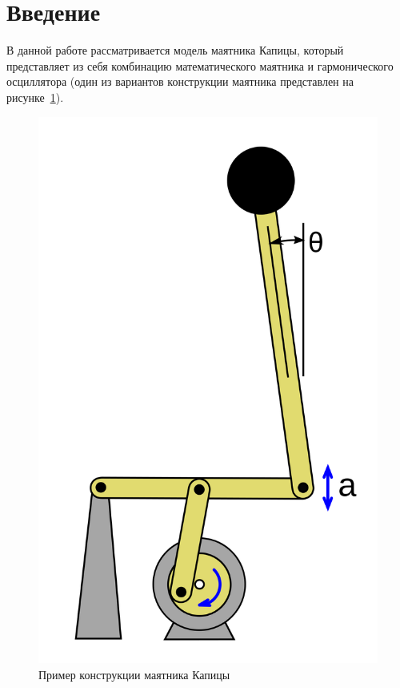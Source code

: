 \documentclass[a4paper,12pt]{article}
\begin{document}
	\newpage
	\section{Введение}
	
	В данной работе рассматривается модель маятника Капицы, который
	представляет из себя комбинацию математического маятника и гармонического
	осциллятора (один из вариантов конструкции маятника представлен на 
	рисунке~\ref{fig:pend}).

	\begin{figure}[ht!]
		  \begin{center}
		  \includegraphics[scale=0.2]{sources/pend.png}
		  \end{center}
		  \vspace*{-8mm}
		  \caption{Пример конструкции маятника Капицы}\label{fig:pend}
	\end{figure}
	
\end{document}
